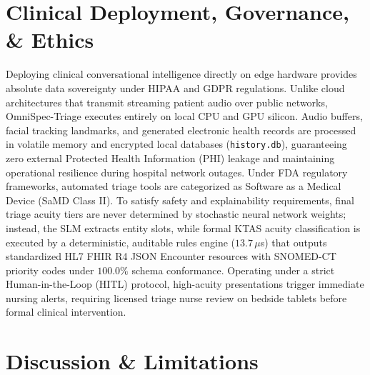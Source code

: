\documentclass[10pt,journal,compsoc]{IEEEtran}
\begin{document}
\section{Clinical Deployment, Governance, \& Ethics}
\label{sec:governance}
Deploying clinical conversational intelligence directly on edge hardware provides absolute data sovereignty under HIPAA and GDPR regulations. Unlike cloud architectures that transmit streaming patient audio over public networks, OmniSpec-Triage executes entirely on local CPU and GPU silicon. Audio buffers, facial tracking landmarks, and
generated electronic health records are processed in volatile memory and encrypted local databases (\texttt{history.db}), guaranteeing zero external Protected Health Information (PHI) leakage and maintaining operational resilience during hospital network outages. Under FDA regulatory frameworks, automated triage tools are categorized as
Software as a Medical Device (SaMD Class II). To satisfy safety and explainability requirements, final triage acuity tiers are never determined by stochastic neural network weights; instead, the SLM extracts entity slots, while formal KTAS acuity classification is executed by a deterministic, auditable rules engine ($13.7\,\mu$s) that
outputs standardized HL7 FHIR R4 JSON Encounter resources with SNOMED-CT priority codes under $100.0\%$ schema conformance. Operating under a strict Human-in-the-Loop (HITL) protocol, high-acuity presentations trigger immediate nursing alerts, requiring licensed triage nurse review on bedside tablets before formal clinical intervention.

\section{Discussion \& Limitations}
\label{sec:discussion}
\end{document}

